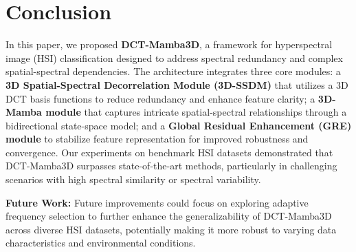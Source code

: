 \section{Conclusion}
\label{sec:conclusion}

In this paper, we proposed \textbf{DCT-Mamba3D}, a framework for hyperspectral image (HSI) classification designed to address spectral redundancy and complex spatial-spectral dependencies. The architecture integrates three core modules: a \textbf{3D Spatial-Spectral Decorrelation Module (3D-SSDM)} that utilizes a 3D DCT basis functions to reduce redundancy and enhance feature clarity; a \textbf{3D-Mamba module} that captures intricate spatial-spectral relationships through a bidirectional state-space model; and a \textbf{Global Residual Enhancement (GRE) module} to stabilize feature representation for improved robustness and convergence. Our experiments on benchmark HSI datasets demonstrated that DCT-Mamba3D surpasses state-of-the-art methods, particularly in challenging scenarios with high spectral similarity or spectral variability.

\textbf{Future Work:}  
Future improvements could focus on exploring adaptive frequency selection to further enhance the generalizability of DCT-Mamba3D across diverse HSI datasets, potentially making it more robust to varying data characteristics and environmental conditions.
